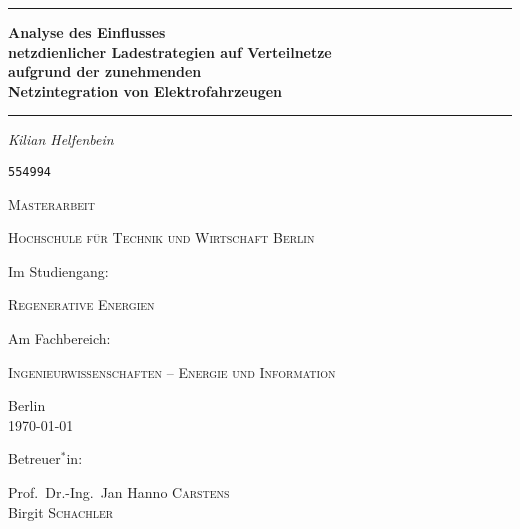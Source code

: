 
\begin{titlepage}
	\centering
	\par\noindent\rule{\textwidth}{0.4pt}
	{\huge\bfseries Analyse des Einflusses\\
	netzdienlicher Ladestrategien auf Verteilnetze\\
	aufgrund der zunehmenden\\
	Netzintegration von Elektrofahrzeugen\par}
	\par\noindent\rule{\textwidth}{0.4pt}\par
	\vspace*{2cm}
	{\Large\itshape Kilian Helfenbein\par}
	{\Large \texttt{554994}\par}
	\vspace{1.5cm}
	{\scshape\Large Masterarbeit\par}
	\vspace{1.5cm}
	{\scshape\LARGE Hochschule für Technik und Wirtschaft Berlin \par}
	\vspace{1cm}
	Im Studiengang:\par
	{\scshape\large Regenerative Energien\par}
	\vspace{.5cm}
	Am Fachbereich:\par
	{\scshape\large Ingenieurwissenschaften {--} Energie und Information\par}
	\vfill
	{\large Berlin\\
	\today\par}
	\vfill
	Betreuer$^*$in:\par
	Prof.~Dr.-Ing.~Jan Hanno \textsc{Carstens}\\
	Birgit \textsc{Schachler}
\end{titlepage}